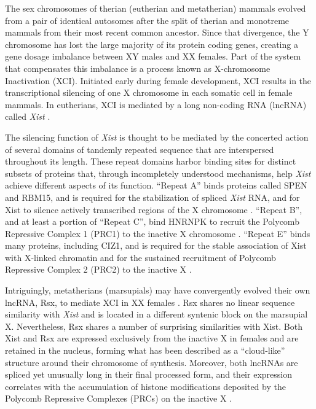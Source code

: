 The sex chromosomes of therian (eutherian and metatherian) mammals evolved from a pair of identical autosomes after the split of therian and monotreme mammals from their most recent common ancestor. Since that divergence, the Y chromosome has lost the large majority of its protein coding genes, creating a gene dosage imbalance between XY males and XX females. Part of the system that compensates this imbalance is a process known as X-chromosome Inactivation (XCI). Initiated early during female development, XCI results in the transcriptional silencing of one X chromosome in each somatic cell in female mammals. In eutherians, XCI is mediated by a long non-coding RNA (lncRNA) called \textit{Xist} \cite{Balaton2018TheChromosome,Brockdorff2018LocalNcRNA,DaRocha2017NovelConformation,Sahakyan2018TheCompensation}. 

The silencing function of \textit{Xist} is thought to be mediated by the concerted action of several domains of tandemly repeated sequence that are interspersed throughout its length. These repeat domains harbor binding sites for distinct subsets of proteins that, through incompletely understood mechanisms, help \textit{Xist} achieve different aspects of its function. “Repeat A” binds proteins called SPEN and RBM15, and is required for the stabilization of spliced \textit{Xist} RNA, and for Xist to silence actively transcribed regions of the X chromosome \cite{Chu2015SystematicProteins,Engreitz2013TheChromosome, Hoki2009AMouse,McHugh2015TheHDAC3, Moindrot2015ASilencing, Patil2016M6Repression,Royce-Tolland2010TheInactivation,Wutz2002ChromosomalRNA}. “Repeat B”, and at least a portion of “Repeat C”, bind HNRNPK to recruit the Polycomb Repressive Complex 1 (PRC1) to the inactive X chromosome \cite{Almeida2017PCGF3/5-PRC1Inactivation,Pintacuda2017HnRNPKSilencing}. “Repeat E” binds many proteins, including CIZ1, and is required for the stable association of Xist with X-linked chromatin and for the sustained recruitment of Polycomb Repressive Complex 2 (PRC2) to the inactive X  \cite{Ridings-Figueroa2017TheTerritory,Smola2016SHAPECells,Sunwoo2017RepeatCIZ1}.

Intriguingly, metatherians (marsupials) may have convergently evolved their own lncRNA, Rsx, to mediate XCI in XX females \cite{Grant2012RsxInactivation}. Rsx shares no linear sequence similarity with \textit{Xist} and is located in a different syntenic block on the marsupial X. Nevertheless, Rsx shares a number of surprising similarities with Xist. Both Xist and Rsx are expressed exclusively from the inactive X in females and are retained in the nucleus, forming what has been described as a “cloud-like” structure around their chromosome of synthesis. Moreover, both lncRNAs are spliced yet unusually long in their final processed form, and their expression correlates with the accumulation of histone modifications deposited by the Polycomb Repressive Complexes (PRCs) on the inactive X \cite{Grant2012RsxInactivation,Wang2011AExpression}. 

